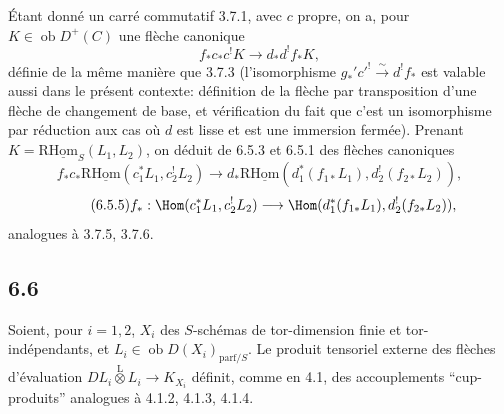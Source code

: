 Étant donné un carré commutatif 3.7.1, avec $c$ propre, on a, pour $K\in\operatorname{ob}D^+(C)$ une flèche canonique
\begin{equation}
\tag{6.5.3}
f_*c_*c^!K\longrightarrow d_*d^!f_*K,
\end{equation}
définie de la même manière que 3.7.3 (l'isomorphisme $g_*'c'^!\xrightarrow{\sim}d^!f_*$ est valable aussi dans le présent contexte: définition de la flèche par transposition d'une flèche de changement de base, et vérification du fait que c'est un isomorphisme par réduction aux cas où $d$ est lisse et est une immersion fermée). Prenant $K=\mathrm{R}\underline{\mathrm{Hom}}_S(L_1,L_2)$, on déduit de 6.5.3 et 6.5.1 des flèches canoniques
\begin{equation}
\tag{6.5.4}
f_*c_*\mathrm{R}\underline{\mathrm{Hom}}(c_1^*L_1,c_2^!L_2)\longrightarrow d_*\mathrm{R}\underline{\mathrm{Hom}}(d_1^*(f_{1*}L_1),d_2^!(f_{2*}L_2)),
\end{equation}
\begin{equation}
\tag{6.5.5}
f_*:\Hom(c_1^*L_1,c_2^!L_2)\longrightarrow\Hom(d_1^*(f_{1*}L_1),d_2^!(f_{2*}L_2)),
\end{equation}
analogues à 3.7.5, 3.7.6.

\subsection*{6.6}
Soient, pour $i=1,2$, $X_i$ des $S$-schémas de tor-dimension finie et tor-indépendants, et $L_i\in\operatorname{ob}D(X_i)_{\mathrm{parf}/S}$. Le produit tensoriel externe des flèches d'évaluation $DL_i\overset{\mathrm{L}}{\otimes}L_i\to K_{X_i}$ définit, comme en 4.1, des accouplements ``cup-produits'' analogues à 4.1.2, 4.1.3, 4.1.4.


